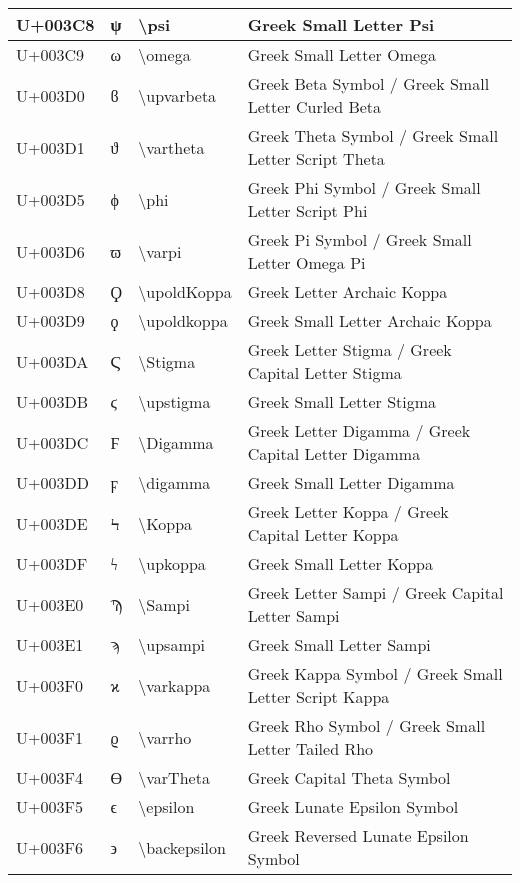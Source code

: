 \begin{table}[h]
\begin{tabulary}{\linewidth}{|L|L|L|L|}
\hline
U+003C8 & ψ & {\textbackslash}psi & Greek Small Letter Psi \\
\hline
U+003C9 & ω & {\textbackslash}omega & Greek Small Letter Omega \\
\hline
U+003D0 & ϐ & {\textbackslash}upvarbeta & Greek Beta Symbol / Greek Small Letter Curled Beta \\
\hline
U+003D1 & ϑ & {\textbackslash}vartheta & Greek Theta Symbol / Greek Small Letter Script Theta \\
\hline
U+003D5 & ϕ & {\textbackslash}phi & Greek Phi Symbol / Greek Small Letter Script Phi \\
\hline
U+003D6 & ϖ & {\textbackslash}varpi & Greek Pi Symbol / Greek Small Letter Omega Pi \\
\hline
U+003D8 & Ϙ & {\textbackslash}upoldKoppa & Greek Letter Archaic Koppa \\
\hline
U+003D9 & ϙ & {\textbackslash}upoldkoppa & Greek Small Letter Archaic Koppa \\
\hline
U+003DA & Ϛ & {\textbackslash}Stigma & Greek Letter Stigma / Greek Capital Letter Stigma \\
\hline
U+003DB & ϛ & {\textbackslash}upstigma & Greek Small Letter Stigma \\
\hline
U+003DC & Ϝ & {\textbackslash}Digamma & Greek Letter Digamma / Greek Capital Letter Digamma \\
\hline
U+003DD & ϝ & {\textbackslash}digamma & Greek Small Letter Digamma \\
\hline
U+003DE & Ϟ & {\textbackslash}Koppa & Greek Letter Koppa / Greek Capital Letter Koppa \\
\hline
U+003DF & ϟ & {\textbackslash}upkoppa & Greek Small Letter Koppa \\
\hline
U+003E0 & Ϡ & {\textbackslash}Sampi & Greek Letter Sampi / Greek Capital Letter Sampi \\
\hline
U+003E1 & ϡ & {\textbackslash}upsampi & Greek Small Letter Sampi \\
\hline
U+003F0 & ϰ & {\textbackslash}varkappa & Greek Kappa Symbol / Greek Small Letter Script Kappa \\
\hline
U+003F1 & ϱ & {\textbackslash}varrho & Greek Rho Symbol / Greek Small Letter Tailed Rho \\
\hline
U+003F4 & ϴ & {\textbackslash}varTheta & Greek Capital Theta Symbol \\
\hline
U+003F5 & ϵ & {\textbackslash}epsilon & Greek Lunate Epsilon Symbol \\
\hline
U+003F6 & ϶ & {\textbackslash}backepsilon & Greek Reversed Lunate Epsilon Symbol \\

\end{tabulary}
\end{table}
